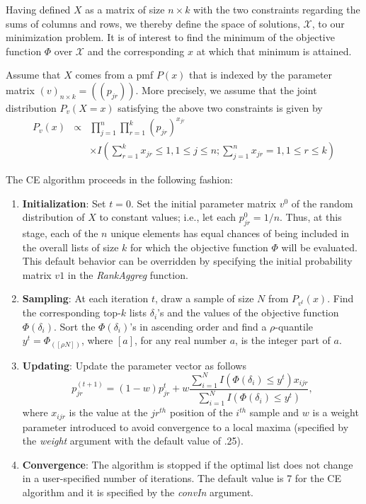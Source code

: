 \documentclass[11pt]{article}
\begin{document}
        Having defined $X$ as a matrix of size $n\times k$ with the
        two constraints regarding the sums of columns and rows, we
        thereby define the space of solutions, $\mathcal{X}$, to our minimization
        problem. It is of interest to find the minimum of the objective function $\Phi$
        over $\mathcal{X}$ and the corresponding $x$ at which that
        minimum is attained.

        Assume
        that $X$ comes from a pmf $P(x)$ that is indexed by the parameter
        matrix $(v)_{n\times k} = ((p_{jr}))$. More precisely, we assume that the joint distribution $P_v(X=x)$ satisfying the
        above two constraints is given by
        \begin{eqnarray*}
        P_v(x) &\propto & \prod_{j=1}^n
        \prod_{r=1}^k(p_{jr})^{x_{jr}} \\
                 &&\times I\left(\sum_{r=1}^k x_{jr} \le 1, 1 \le j \le n; \sum_{j=1}^n x_{jr} = 1, 1 \le r \le k\right)
        \end{eqnarray*}

        \noindent The CE algorithm proceeds in the following fashion:
        \begin{enumerate}
        \item{\textbf{Initialization}: Set $t=0$. Set the initial parameter matrix $v^0$ of the random
        distribution of $X$ to constant values; i.e., let each $p_{jr}^0=1/n$. Thus, at this
        stage, each of the $n$ unique elements has equal chances of being included in the overall lists of size
        $k$ for which the objective function $\Phi$ will be evaluated. This default behavior can
        be overridden by specifying the initial probability matrix $v1$ in the \emph{RankAggreg} function.}
		
        \item{\textbf{Sampling}: At each iteration $t$, draw a sample of size $N$ from $P_{v^t}(x)$. Find
        the corresponding top-$k$ lists $\delta_i$'s and the values of the objective
        function $\Phi(\delta_i)$. Sort the $\Phi(\delta_i)$'s in ascending
        order and find a $\rho$-quantile $y^t=\Phi_{([\rho N])}$, where $[a]$, for any
        real number $a$, is the integer part of $a$.}

        \item{\textbf{Updating}: Update the parameter vector as follows
        $$
        p_{jr}^{(t+1)}=(1-w)p_{jr}^t+w\frac{\sum^N_{i=1}I(\Phi(\delta_i) \le
        y^t)x_{ijr}}{\sum^N_{i=1}I(\Phi(\delta_i) \le y^t)},
        $$
        where $x_{ijr}$ is the value at the $jr^{th}$ position of the $i^{th}$ sample and
        $w$ is a weight parameter introduced to avoid convergence to a local
        maxima (specified by the \emph{weight} argument with the default value of .25).}
		
        \item{\textbf{Convergence}: The algorithm is stopped if the optimal list does not change in a 
        user-specified number of iterations. The default value is 7 for the CE algorithm 
        and it is specified by the \emph{convIn} argument.}
        \end{enumerate}
\end{document}
